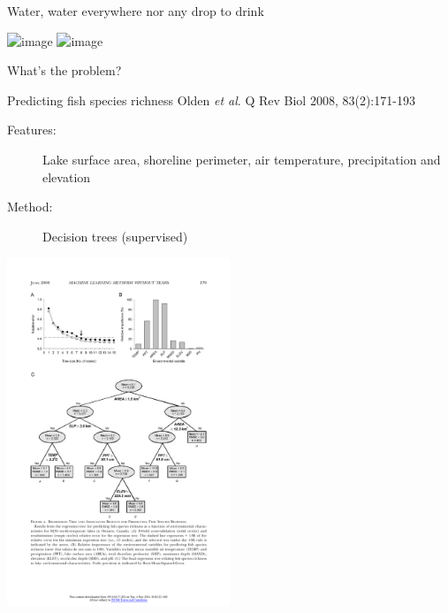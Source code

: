 \documentclass[pdf]{beamer}
\begin{document}
\begin{frame}{Water, water everywhere nor any drop to drink}
\begin{center}	
	\includegraphics<1>[width=0.95\textwidth]{bigDataCartoon.jpg}
	\includegraphics<2>[width=0.95\textwidth]{pulpFiction.jpg}
\end{center}
\end{frame}
\begin{frame}{What's the problem?}
\begin{exampleblock}{Predicting fish species richness \vskip-1mm{\tiny Olden \textit{et al}. Q Rev Biol 2008, 83(2):171-193}}
\begin{description}
	\item[Features:] Lake surface area, shoreline perimeter, air temperature, precipitation and elevation
	\item[Method:] Decision trees (supervised)
\end{description}
\begin{center}
	\includegraphics[width=0.5\textwidth]{olden.pdf}
\end{center}
\end{exampleblock}
\end{frame}
\end{document}
